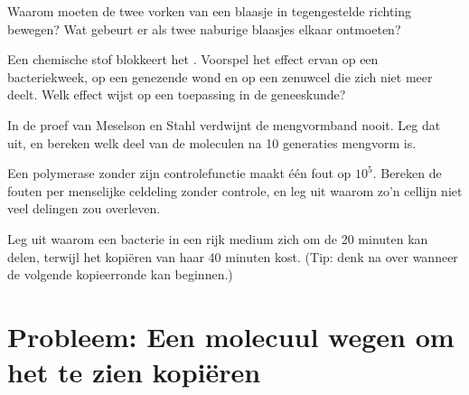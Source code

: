 \begin{exercise}[$\star\star$]\label{exo:g11:dna-replication:11}
Waarom moeten de twee vorken van een blaasje in tegengestelde richting
bewegen? Wat gebeurt er als twee naburige blaasjes elkaar ontmoeten?
\end{exercise}

\begin{exercise}[$\star\star\star$]\label{exo:g11:dna-replication:12}
Een chemische stof blokkeert het . Voorspel het effect
ervan op een bacteriekweek, op een genezende wond en op een zenuwcel die
zich niet meer deelt. Welk effect wijst op een toepassing in de
geneeskunde?
\end{exercise}

\begin{exercise}[$\star\star\star$]\label{exo:g11:dna-replication:13}
In de proef van Meselson en Stahl verdwijnt de mengvormband nooit. Leg
dat uit, en bereken welk deel van de moleculen na 10 generaties mengvorm
is.
\end{exercise}

\begin{exercise}[$\star\star\star$]\label{exo:g11:dna-replication:14}
Een polymerase zonder zijn controlefunctie maakt één fout op $10^5$.
Bereken de fouten per menselijke celdeling zonder controle, en leg uit
waarom zo'n cellijn niet veel delingen zou overleven.
\end{exercise}

\begin{exercise}[$\star\star\star$]\label{exo:g11:dna-replication:15}
Leg uit waarom een bacterie in een rijk medium zich om de 20 minuten kan
delen, terwijl het kopiëren van haar  40 minuten kost. (Tip:
denk na over wanneer de volgende kopieerronde kan beginnen.)
\end{exercise}

\section{Probleem: Een molecuul wegen om het te zien kopiëren}

